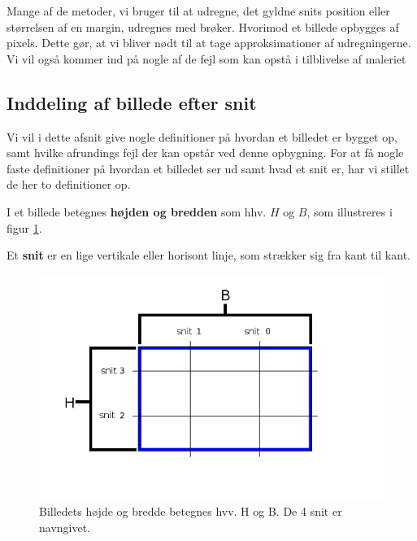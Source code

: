 \textsf{
Mange af de metoder, vi bruger til at udregne, det gyldne snits position
eller størrelsen af en margin, udregnes med brøker. Hvorimod et billede
opbygges af pixels. Dette gør, at vi bliver nødt til at tage
approksimationer af udregningerne. Vi vil også kommer ind på nogle af de
fejl som kan opstå i tilblivelse af maleriet}

\subsection{Inddeling af billede efter snit}
Vi vil i dette afsnit give nogle definitioner på hvordan et billedet er
bygget op, samt hvilke afrundings fejl der kan opstår ved denne
opbygning. For at få nogle faste definitioner på hvordan et billedet ser
ud samt hvad et snit er, har vi stillet de her to definitioner op.

\begin{definition}
	I et billede betegnes \textbf{højden og bredden} som hhv. $H$ og
	$B$, som illustreres i figur \ref{cut}.
\end{definition}

\begin{definition}
	Et \textbf{snit} er en lige vertikale eller horisont linje, som
	strækker sig fra kant til kant.
\end{definition}

\begin{figure}[h]
	\begin{center}
		\includegraphics[scale=0.42,angle=0]{afsnit/vores_implementation/billeder/naiv_algoritme/Cut}
	\end{center}
	\caption[]{Billedets højde og bredde betegnes hvv. H og B. De 4 snit er navngivet.}
	\label{cut}
\end{figure}

